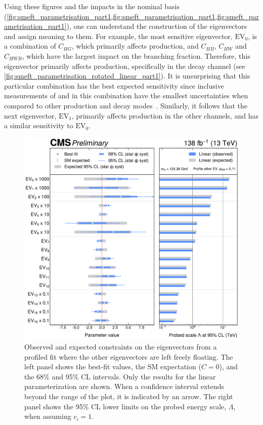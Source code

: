 Using these figures and the impacts in the nominal basis (\cref{fig:smeft_parametrisation_part1,fig:smeft_parametrisation_part1,fig:smeft_parametrisation_part1}), one can understand the construction of the eigenvectors and assign meaning to them. For example, the most sensitive eigenvector, $\mathrm{EV}_0$, is a combination of $C_{HG}$, which primarily affects \ggH production, and $C_{HB}$, $C_{HW}$ and $C_{HWB}$, which have the largest impact on the \Hgg branching fraction. Therefore, this eigenvector primarily affects \ggH production, specifically in the \Hgg decay channel (see \cref{fig:smeft_parametrisation_rotated_linear_part1}). It is unsurprising that this particular combination has the best expected sensitivity since inclusive measurements of \ggH and \Hgg in this combination have the smallest uncertainties when compared to other production and decay modes~\cite{CMS-PAS-HIG-21-018}. Similarly, it follows that the next eigenvector, $\mathrm{EV}_1$, primarily affects \ggH production in the other channels, and has a similar sensitivity to $\mathrm{EV}_0$.

\begin{figure}
  \centering
  \includegraphics[width=1\textwidth]{Figures/EFT/HIG-21-018-Figure_021.pdf}
  \caption[Simultaneous Constraints on the SMEFT Eigenvectors]{Observed and expected constraints on the eigenvectors from a profiled fit where the other eigenvectors are left freely floating. The left panel shows the best-fit values, the SM expectation ($C=0$), and the 68\% and 95\% CL intervals. Only the results for the linear parameterization are shown. When a confidence interval extends beyond the range of the plot, it is indicated by an arrow. The right panel shows the 95\% CL lower limits on the probed energy scale, $\Lambda$, when assuming $c_i=1$.}\label{fig:summary_SMEFT_linearOnly}
\end{figure}

